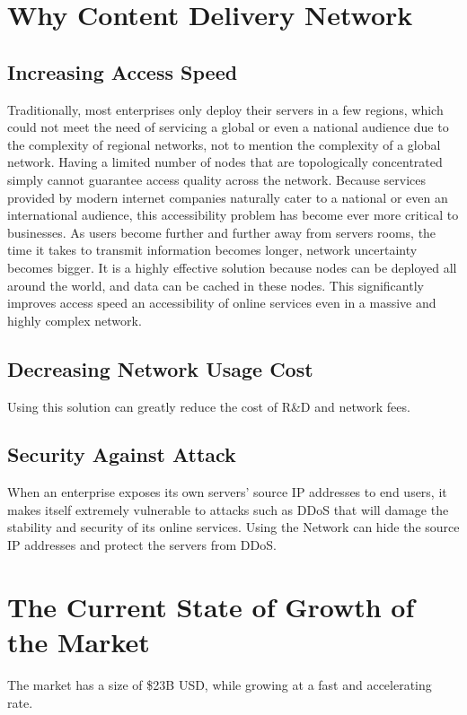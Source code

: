 \documentclass[12pt, a4paper, unicode]{report}
\begin{document}
    
    \section{Why Content Delivery Network}
    \subsection{Increasing Access Speed}
    Traditionally, most enterprises only deploy their servers in a few regions, which could not meet the need of servicing a global or even a national audience due to the complexity of regional networks, not to mention the complexity of a global network. Having a limited number of nodes that are topologically concentrated simply cannot guarantee access quality across the network. Because services provided by modern internet companies naturally cater to a national or even an international audience, this accessibility problem has become ever more critical to businesses. As users become further and further away from servers rooms, the time it takes to transmit information becomes longer, network uncertainty becomes bigger. It is a highly effective solution because nodes can be deployed all around the world, and data can be cached in these nodes. This significantly improves access speed an accessibility of online services even in a massive and highly complex network.
    
    \subsection{Decreasing Network Usage Cost}
    Using this solution can greatly reduce the cost of R\&D and network fees.

    \subsection{Security Against Attack}
    When an enterprise exposes its own servers' source IP addresses to end users, it makes itself extremely vulnerable to attacks such as DDoS that will damage the stability and security of its online services. Using the Network can hide the source IP addresses and protect the servers from DDoS.

    \section{The Current State of Growth of the Market}
    The market has a size of \$23B USD, while growing at a fast and accelerating rate.
    
\end{document}
